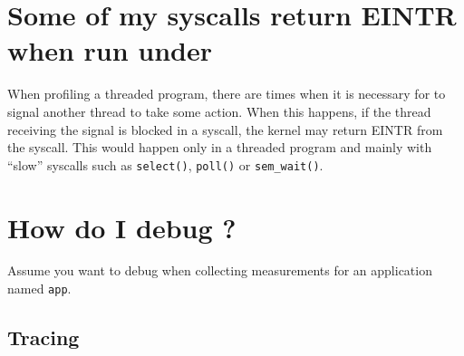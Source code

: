 \documentclass[11pt,letterpaper]{report}
\begin{document}

\section{Some of my syscalls return EINTR when run under \hpcrun{}}

When profiling a threaded program, there are times when it is
necessary for \hpcrun{} to signal another thread to take some action.
When this happens, if the thread receiving the signal is blocked in a
syscall, the kernel may return EINTR from the syscall.  This would
happen only in a threaded program and mainly with ``slow'' syscalls
such as {\tt select()}, {\tt poll()} or {\tt sem\_wait()}.



\section{How do I debug \hpcrun{}?}

Assume you want to debug \hpcrun{} when collecting measurements for an application named \texttt{app}.


\subsection{Tracing \libmonitor{}}
\end{document}
